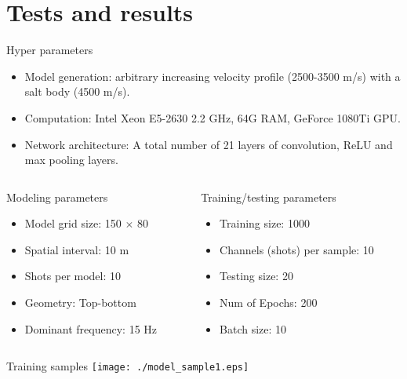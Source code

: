 \documentclass[aspectratio=169]{beamer}
\begin{document}
\section{Tests and results}
\begin{frame}{Hyper parameters}

\begin{itemize}
\item{Model generation: arbitrary increasing velocity profile (2500-3500 m/s) with a salt body (4500 m/s).}
\item{Computation: Intel Xeon E5-2630 2.2 GHz, 64G RAM, GeForce 1080Ti GPU.}
\item{Network architecture: A total number of 21 layers of convolution, ReLU and max pooling layers.}
\end{itemize}

\begin{columns}
  \begin{column}{0.50\textwidth}
  \begin{block}{Modeling parameters}
    \begin{itemize}
    \item{Model grid size: 150 $\times$ 80}
    \item{Spatial interval: 10 m}
    \item{Shots per model: 10}
    \item{Geometry: Top-bottom}
    \item{Dominant frequency: 15 Hz}
    \end{itemize}
  \end{block}
  \end{column}
  \begin{column}{0.50\textwidth}
  \begin{block}{Training/testing parameters}
    \begin{itemize}
    \item{Training size: 1000}
    \item{Channels (shots) per sample: 10}
    \item{Testing size: 20}
    \item{Num of Epochs: 200}
    \item{Batch size: 10}
    \end{itemize}
  \end{block}
  \end{column}
\end{columns}
\end{frame}
\begin{frame}{Training samples}
    \texttt{[image: ./model\_sample1.eps]}
\end{frame}
\end{document}
